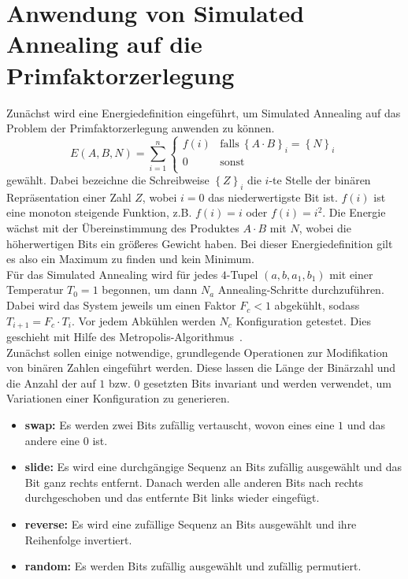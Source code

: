 \section{Anwendung von Simulated Annealing auf die Primfaktorzerlegung}\label{sec:annealfac}
Zunächst wird eine Energiedefinition eingeführt, um Simulated Annealing auf das Problem der Primfaktorzerlegung anwenden zu können.
\begin{equation*}
		E\left(A,B,N\right)=\sum\limits_{i=1}^n\begin{cases}
		  		f\left(i\right) & \mathrm{falls}\:{\left\{A\cdot B\right\}}_i={\left\{N\right\}}_i \\
						0 & \mathrm{sonst}\\
				\end{cases}
\end{equation*}
gewählt. Dabei bezeichne die Schreibweise ${\left\{Z\right\}}_i$ die $i$-te Stelle der binären Repräsentation einer Zahl $Z$, wobei $i=0$ das niederwertigste Bit ist. $f\left(i\right)$ ist eine monoton steigende Funktion, z.B. $f\left(i\right)=i$ oder $f\left(i\right)=i^2$. Die Energie wächst mit der Übereinstimmung des Produktes $A\cdot B$ mit $N$, wobei die höherwertigen Bits ein größeres Gewicht haben. Bei dieser Energiedefinition gilt es also ein Maximum zu finden und kein Minimum. \\
Für das Simulated Annealing wird für jedes $4$-Tupel $\left(a,b,a_1,b_1\right)$ mit einer Temperatur $T_0=1$ begonnen, um dann $N_a$ Annealing-Schritte durchzuführen. Dabei wird das System jeweils um einen Faktor $F_c < 1$ abgekühlt, sodass $T_{i+1}=F_c\cdot T_i$. Vor jedem Abkühlen werden $N_c$ Konfiguration getestet. Dies geschieht mit Hilfe des Metropolis-Algorithmus~\parencite{metropolis}. \\
Zunächst sollen einige notwendige, grundlegende Operationen zur Modifikation von binären Zahlen eingeführt werden. Diese lassen die Länge der Binärzahl und die Anzahl der auf $1$ bzw. $0$ gesetzten Bits invariant und werden verwendet, um Variationen einer Konfiguration zu generieren.
\begin{itemize}
		\item \textbf{swap:} Es werden zwei Bits zufällig vertauscht, wovon eines eine $1$ und das andere eine $0$ ist.
		\item \textbf{slide:} Es wird eine durchgängige Sequenz an Bits zufällig ausgewählt und das Bit ganz rechts entfernt. Danach werden alle anderen Bits nach rechts durchgeschoben und das entfernte Bit links wieder eingefügt.
		\item \textbf{reverse:} Es wird eine zufällige Sequenz an Bits ausgewählt und ihre Reihenfolge invertiert.
		\item \textbf{random:} Es werden Bits zufällig ausgewählt und zufällig permutiert.
\end{itemize}
